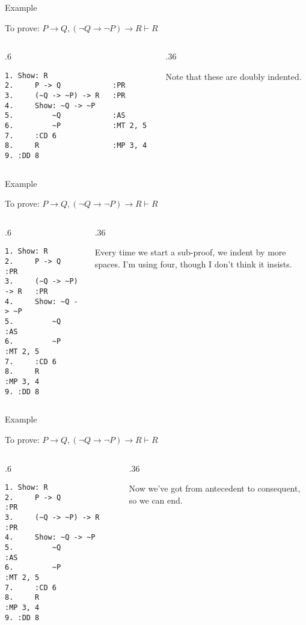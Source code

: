 \documentclass[
  ignorenonframetext,
]{beamer}
\renewcommand{\,}{\text{, }}
\def\begincols{\begin{columns}}
\def\begincol{\begin{column}}
\def\endcol{\end{column}}
\def\endcols{\end{columns}}
\begin{document}
\begin{frame}[fragile]{Example}
\protect\hypertarget{example-8}{}

To prove:
\(P \rightarrow Q, (\neg Q \rightarrow \neg P) \rightarrow R \vdash R\)

\bigskip

\begincols
\begincol{.6\textwidth}

\begin{verbatim}
1. Show: R
2.     P -> Q            :PR
3.     (~Q -> ~P) -> R   :PR
4.     Show: ~Q -> ~P
5.         ~Q            :AS
6.         ~P            :MT 2, 5
7.     :CD 6
8.     R                 :MP 3, 4
9. :DD 8
\end{verbatim}

\endcol
\begincol{.36\textwidth}

Note that these are doubly indented.

\endcol
\endcols

\end{frame}

\begin{frame}[fragile]{Example}
\protect\hypertarget{example-9}{}

To prove:
\(P \rightarrow Q, (\neg Q \rightarrow \neg P) \rightarrow R \vdash R\)

\bigskip

\begincols
\begincol{.6\textwidth}

\begin{verbatim}
1. Show: R
2.     P -> Q            :PR
3.     (~Q -> ~P) -> R   :PR
4.     Show: ~Q -> ~P
5.         ~Q            :AS
6.         ~P            :MT 2, 5
7.     :CD 6
8.     R                 :MP 3, 4
9. :DD 8
\end{verbatim}

\endcol
\begincol{.36\textwidth}

Every time we start a sub-proof, we indent by more spaces. I'm using
four, though I don't think it insists.

\endcol
\endcols

\end{frame}

\begin{frame}[fragile]{Example}
\protect\hypertarget{example-10}{}

To prove:
\(P \rightarrow Q, (\neg Q \rightarrow \neg P) \rightarrow R \vdash R\)

\bigskip

\begincols
\begincol{.6\textwidth}

\begin{verbatim}
1. Show: R
2.     P -> Q            :PR
3.     (~Q -> ~P) -> R   :PR
4.     Show: ~Q -> ~P
5.         ~Q            :AS
6.         ~P            :MT 2, 5
7.     :CD 6
8.     R                 :MP 3, 4
9. :DD 8
\end{verbatim}

\endcol
\begincol{.36\textwidth}

Now we've got from antecedent to consequent, so we can end.

\endcol
\endcols

\end{frame}
\end{document}
